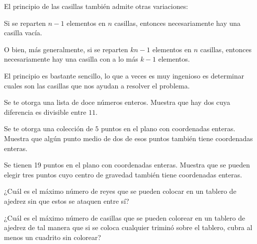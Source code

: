 El principio de las casillas también admite otras variaciones:

Si se reparten $n-1$ elementos en $n$ casillas, entonces necesariamente hay una casilla vacía.

O bien, más generalmente, si se reparten $kn-1$ elementos en $n$ casillas, entonces necesariamente hay una casilla con a lo más $k-1$ elementos.
\vspace{2cm}


El principio es bastante sencillo, lo que a veces es muy ingenioso es determinar cuales son las casillas que nos ayudan a resolver el problema.

\begin{ejercicio}
Se te otorga una lista de doce números enteros. Muestra que hay dos cuya diferencia es divisible entre $11$.
\end{ejercicio}
\vspace{2cm}

\begin{ejercicio}
Se te otorga una colección de $5$ puntos en el plano con coordenadas enteras. Muestra que algún punto medio de dos de esos puntos también tiene coordenadas enteras.
\end{ejercicio}
\vspace{2cm}

\begin{problema} [OMM '90]
Se tienen 19 puntos en el plano con coordenadas enteras. Muestra que se pueden elegir tres puntos cuyo centro de gravedad también tiene coordenadas enteras.
\end{problema}
\vspace{2cm}
\newpage

\begin{ejercicio}
¿Cuál es el máximo número de reyes que se pueden colocar en un tablero de ajedrez sin que estos se ataquen entre sí? 
\end{ejercicio}

  
  

\begin{ejercicio}
¿Cuál es el máximo número de casillas que se pueden colorear en un tablero de ajedrez de tal manera que si se coloca cualquier triminó sobre el tablero, cubra al menos un cuadrito sin colorear?
\end{ejercicio}

